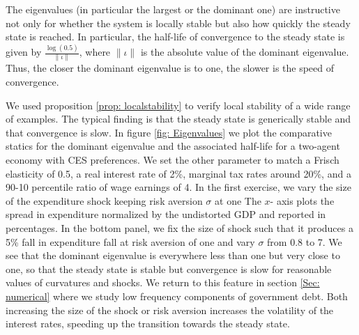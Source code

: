 \documentclass[thmsb,11pt]{article}
\begin{document}
The eigenvalues (in particular the largest or the dominant one) are instructive not only for whether the system is locally stable but also how quickly the steady state is reached. In particular, the half-life of convergence to the steady state is given by $\frac{\log(0.5)}{\|\iota\|}$, where $\|\iota\|$ is the absolute value of the dominant eigenvalue.  Thus, the closer the dominant eigenvalue is to one, the slower is the speed of convergence.

We used proposition \ref{prop: localstability} to verify local stability of a wide range of examples. The typical finding is that the steady state is generically stable and that convergence is slow. In figure \ref{fig: Eigenvalues} we plot the comparative statics for the dominant eigenvalue and the associated  half-life for a two-agent economy with CES preferences. %
We set the other parameter to match a Frisch elasticity of 0.5,  a real interest rate of 2\%, marginal tax rates  around 20\%, and a 90-10 percentile ratio of wage earnings of 4. In the first exercise, we vary the size of the expenditure shock keeping risk aversion $\sigma$ at one The $x$- axis plots the spread in expenditure normalized by the undistorted GDP and reported in percentages. In the bottom panel, we fix the size of shock such that it produces a 5\% fall in expenditure fall at risk aversion of one and vary $\sigma$ from 0.8 to 7. We see that the dominant eigenvalue is everywhere less than one but very close to one, so that the steady state is stable but convergence is slow for reasonable values of curvatures and shocks.  We return to this feature in section \ref{Sec: numerical} where we study low frequency components of government debt. Both increasing the size of the shock or risk aversion increases the volatility of the interest rates, speeding up the transition towards the steady state.

%
\end{document}
